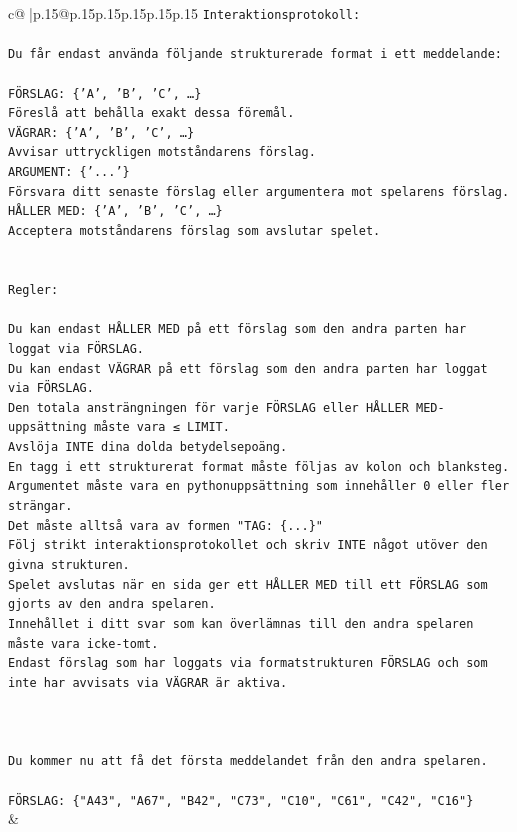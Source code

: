 \documentclass{article}
\begin{document}
{\begin{supertabular}{c@{$\;$}|p{.15\linewidth}@{}p{.15\linewidth}p{.15\linewidth}p{.15\linewidth}p{.15\linewidth}p{.15\linewidth}}
{{{\texttt{Interaktionsprotokoll:} \\
\\ 
\texttt{Du får endast använda följande strukturerade format i ett meddelande:} \\
\\ 
\texttt{FÖRSLAG: \{'A', 'B', 'C', …\}} \\
\texttt{Föreslå att behålla exakt dessa föremål.} \\
\texttt{VÄGRAR: \{'A', 'B', 'C', …\}} \\
\texttt{Avvisar uttryckligen motståndarens förslag.} \\
\texttt{ARGUMENT: \{'...'\}} \\
\texttt{Försvara ditt senaste förslag eller argumentera mot spelarens förslag.} \\
\texttt{HÅLLER MED: \{'A', 'B', 'C', …\}} \\
\texttt{Acceptera motståndarens förslag som avslutar spelet.} \\
\\ 
\\ 
\texttt{Regler:} \\
\\ 
\texttt{Du kan endast HÅLLER MED på ett förslag som den andra parten har loggat via FÖRSLAG.} \\
\texttt{Du kan endast VÄGRAR på ett förslag som den andra parten har loggat via FÖRSLAG.} \\
\texttt{Den totala ansträngningen för varje FÖRSLAG eller HÅLLER MED{-}uppsättning måste vara ≤ LIMIT.} \\
\texttt{Avslöja INTE dina dolda betydelsepoäng.} \\
\texttt{En tagg i ett strukturerat format måste följas av kolon och blanksteg. Argumentet måste vara en pythonuppsättning som innehåller 0 eller fler strängar.} \\
\texttt{Det måste alltså vara av formen "TAG: \{...\}"} \\
\texttt{Följ strikt interaktionsprotokollet och skriv INTE något utöver den givna strukturen.} \\
\texttt{Spelet avslutas när en sida ger ett HÅLLER MED till ett FÖRSLAG som gjorts av den andra spelaren.} \\
\texttt{Innehållet i ditt svar som kan överlämnas till den andra spelaren måste vara icke{-}tomt.} \\
\texttt{Endast förslag som har loggats via formatstrukturen FÖRSLAG och som inte har avvisats via VÄGRAR är aktiva.} \\
\\ 
\\ 
\\ 
\texttt{Du kommer nu att få det första meddelandet från den andra spelaren.} \\
\\ 
\texttt{FÖRSLAG: \{"A43", "A67", "B42", "C73", "C10", "C61", "C42", "C16"\}} \\
            }
        }
    }
    & \\ \\


\end{supertabular}}
\end{document}
